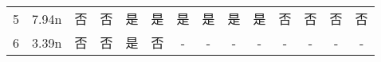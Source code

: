 \documentclass[withoutpreface,bwprint]{cumcmthesis} %
\begin{document}
\begin{table}[htbp]
{\begin{tabular}{c|c|cccc|cccc|cccc}
		5                   & 7.94n                  & 否                                                 & 否                                                 & 是                                               & 是                                                 & 是                                                 & 是                                                 & 是                                               & 是                                                 & 否                                                 & 否                                                 & 否                                               & 否                                                 \\
		6                   & 3.39n                  & 否                                                 & 否                                                 & 是                                               & 否                                                 & -                                                 & -                                                 & -                                               & -                                                 & -                                                 & -                                                 & -                                               & -                                                 \\ \bottomrule[1.5pt]
	\end{tabular}
}
\end{table}
\end{document}

